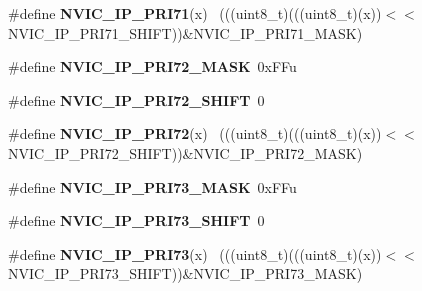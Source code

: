 \begin{DoxyCompactItemize}
\item 
\hypertarget{group___n_v_i_c___register___masks_ga1cddcb0417b23e6abfe9923c3b39a822}{}\#define {\bfseries N\+V\+I\+C\+\_\+\+I\+P\+\_\+\+P\+R\+I71}(x)                                              ~(((uint8\+\_\+t)(((uint8\+\_\+t)(x))$<$$<$N\+V\+I\+C\+\_\+\+I\+P\+\_\+\+P\+R\+I71\+\_\+\+S\+H\+I\+F\+T))\&N\+V\+I\+C\+\_\+\+I\+P\+\_\+\+P\+R\+I71\+\_\+\+M\+A\+S\+K)\label{group___n_v_i_c___register___masks_ga1cddcb0417b23e6abfe9923c3b39a822}

\item 
\hypertarget{group___n_v_i_c___register___masks_gab53a2debd9d28c69e531285f666c15c9}{}\#define {\bfseries N\+V\+I\+C\+\_\+\+I\+P\+\_\+\+P\+R\+I72\+\_\+\+M\+A\+S\+K}~0x\+F\+Fu\label{group___n_v_i_c___register___masks_gab53a2debd9d28c69e531285f666c15c9}

\item 
\hypertarget{group___n_v_i_c___register___masks_gabe45faa003bcfb912df58f41a07f51fc}{}\#define {\bfseries N\+V\+I\+C\+\_\+\+I\+P\+\_\+\+P\+R\+I72\+\_\+\+S\+H\+I\+F\+T}~0\label{group___n_v_i_c___register___masks_gabe45faa003bcfb912df58f41a07f51fc}

\item 
\hypertarget{group___n_v_i_c___register___masks_ga203ad547d73082c5722f264e8d39ebde}{}\#define {\bfseries N\+V\+I\+C\+\_\+\+I\+P\+\_\+\+P\+R\+I72}(x)                                              ~(((uint8\+\_\+t)(((uint8\+\_\+t)(x))$<$$<$N\+V\+I\+C\+\_\+\+I\+P\+\_\+\+P\+R\+I72\+\_\+\+S\+H\+I\+F\+T))\&N\+V\+I\+C\+\_\+\+I\+P\+\_\+\+P\+R\+I72\+\_\+\+M\+A\+S\+K)\label{group___n_v_i_c___register___masks_ga203ad547d73082c5722f264e8d39ebde}

\item 
\hypertarget{group___n_v_i_c___register___masks_ga2e5ed7c2df92da233fe31881f88f72e4}{}\#define {\bfseries N\+V\+I\+C\+\_\+\+I\+P\+\_\+\+P\+R\+I73\+\_\+\+M\+A\+S\+K}~0x\+F\+Fu\label{group___n_v_i_c___register___masks_ga2e5ed7c2df92da233fe31881f88f72e4}

\item 
\hypertarget{group___n_v_i_c___register___masks_gaa91642d3021f494c8c4ed4767a88c997}{}\#define {\bfseries N\+V\+I\+C\+\_\+\+I\+P\+\_\+\+P\+R\+I73\+\_\+\+S\+H\+I\+F\+T}~0\label{group___n_v_i_c___register___masks_gaa91642d3021f494c8c4ed4767a88c997}

\item 
\hypertarget{group___n_v_i_c___register___masks_ga62e6a80ddf369bc2ac3e92982b843105}{}\#define {\bfseries N\+V\+I\+C\+\_\+\+I\+P\+\_\+\+P\+R\+I73}(x)                                              ~(((uint8\+\_\+t)(((uint8\+\_\+t)(x))$<$$<$N\+V\+I\+C\+\_\+\+I\+P\+\_\+\+P\+R\+I73\+\_\+\+S\+H\+I\+F\+T))\&N\+V\+I\+C\+\_\+\+I\+P\+\_\+\+P\+R\+I73\+\_\+\+M\+A\+S\+K)\label{group___n_v_i_c___register___masks_ga62e6a80ddf369bc2ac3e92982b843105}


\end{DoxyCompactItemize}
